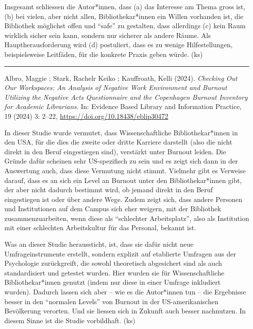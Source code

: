 \documentclass[a4paper,
fontsize=11pt,
oneside,
numbers=noperiodatend,
parskip=half-,
bibliography=totoc,
final
]{scrartcl}
\begin{document}
Insgesamt schliessen die Autor*innen, dass (a) das Interesse am Thema
gross ist, (b) bei vielen, aber nicht allen, Bibliothekar*innen ein
Willen vorhanden ist, die Bibliothek möglichst offen und \enquote{safe}
zu gestalten, dass allerdings (c) kein Raum wirklich sicher sein kann,
sondern nur sicherer als andere Räume. Als Hauptherausforderung wird (d)
postuliert, dass es zu wenige Hilfestellungen, beispielsweise Leitfäden,
für die konkrete Praxis geben würde. (ks)

\begin{center}\rule{0.5\linewidth}{0.5pt}\end{center}

Albro, Maggie ; Stark, Rachelr Keiko ; Kauffroath, Kelli (2024).
\emph{Checking Out Our Workspaces: An Analysis of Negative Work
Environment and Burnout Utilizing the Negative Acts Questionnaire and
the Copenhagen Burnout Inventory for Academic Librarians.} In: Evidence
Based Library and Information Practice, 19 (2024) 3: 2--22,
\url{https://doi.org/10.18438/eblip30472}

In dieser Studie wurde vermutet, dass Wissenschaftliche
Bibliothekar*innen in den USA, für die dies die zweite oder dritte
Karriere darstellt (also die nicht direkt in den Beruf eingestiegen
sind), verstärkt unter Burnout leiden. Die Gründe dafür scheinen sehr
US-spezifisch zu sein und es zeigt sich dann in der Auswertung auch,
dass diese Vermutung nicht stimmt. Vielmehr gibt es Verweise darauf,
dass es an sich ein Level an Burnout unter den Bibliothekar*innen gibt,
der aber nicht dadurch bestimmt wird, ob jemand direkt in den Beruf
eingestiegen ist oder über andere Wege. Zudem zeigt sich, dass andere
Personen und Institutionen auf dem Campus sich eher weigern, mit der
Bibliothek zusammenzuarbeiten, wenn diese als \enquote{schlechter
Arbeitsplatz}, also als Institution mit einer schlechten Arbeitskultur
für das Personal, bekannt ist.

Was an dieser Studie heraussticht, ist, dass sie dafür nicht neue
Umfrageinstrumente erstellt, sondern explizit auf etablierte Umfragen
aus der Psychologie zurückgreift, die sowohl theoretisch abgesichert
sind als auch standardisiert und getestet wurden. Hier wurden sie für
Wissenschaftliche Bibliothekar*innen genutzt (indem nur diese in einer
Umfrage inkludiert wurden). Dadurch lassen sich aber -- wie es die
Autor*innen tun -- die Ergebnisse besser in den \enquote{normalen
Levels} von Burnout in der US-amerikanischen Bevölkerung verorten. Und
sie liessen sich in Zukunft auch besser nachnutzen. In diesem Sinne ist
die Studie vorbildhaft. (ks)
\end{document}
